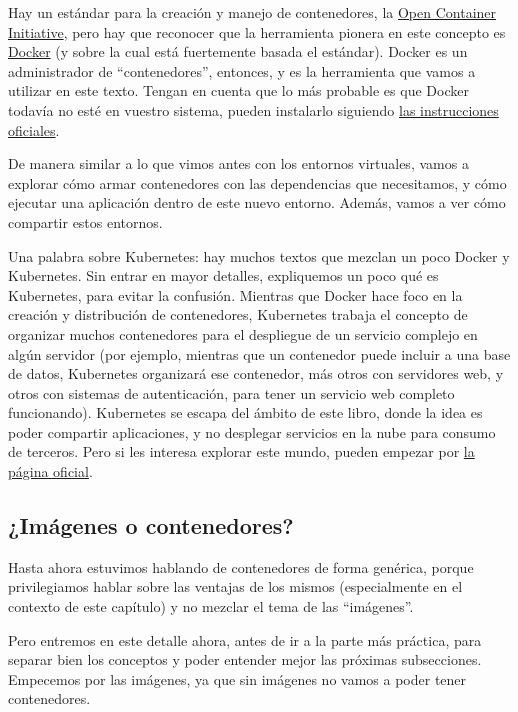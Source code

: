 Hay un estándar para la creación y manejo de contenedores, la \href{https://opencontainers.org/}{Open Container Initiative}, pero hay que reconocer que la herramienta pionera en este concepto es \href{https://www.docker.com/}{Docker} (y sobre la cual está fuertemente basada el estándar). Docker es un administrador de ``contenedores'', entonces, y es la herramienta que vamos a utilizar en este texto. Tengan en cuenta que lo más probable es que Docker todavía no esté en vuestro sistema, pueden instalarlo siguiendo \href{https://docs.docker.com/get-started/#download-and-install-docker}{las instrucciones oficiales}.

De manera similar a lo que vimos antes con los entornos virtuales, vamos a explorar cómo armar contenedores con las dependencias que necesitamos, y cómo ejecutar una aplicación dentro de este nuevo entorno. Además, vamos a ver cómo compartir estos entornos.

Una palabra sobre Kubernetes: hay muchos textos que mezclan un poco Docker y Kubernetes. Sin entrar en mayor detalles, expliquemos un poco qué es Kubernetes, para evitar la confusión. Mientras que Docker hace foco en la creación y distribución de contenedores, Kubernetes trabaja el concepto de organizar muchos contenedores para el despliegue de un servicio complejo en algún servidor (por ejemplo, mientras que un contenedor puede incluir a una base de datos, Kubernetes organizará ese contenedor, más otros con servidores web, y otros con sistemas de autenticación, para tener un servicio web completo funcionando). Kubernetes se escapa del ámbito de este libro, donde la idea es poder compartir aplicaciones, y no desplegar servicios en la nube para consumo de terceros. Pero si les interesa explorar este mundo, pueden empezar por \href{https://kubernetes.io/es/docs/concepts/overview/what-is-kubernetes/}{la página oficial}.


\subsection{¿Imágenes o contenedores?}

Hasta ahora estuvimos hablando de contenedores de forma genérica, porque privilegiamos hablar sobre las ventajas de los mismos (especialmente en el contexto de este capítulo) y no mezclar el tema de las ``imágenes''.

Pero entremos en este detalle ahora, antes de ir a la parte más práctica, para separar bien los conceptos y poder entender mejor las próximas subsecciones. Empecemos por las imágenes, ya que sin imágenes no vamos a poder tener contenedores.

